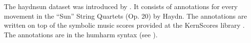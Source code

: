 

The \gls{haydnsun} dataset was introduced by
\textcite{napoleslopez2017automatic}. It consists of
annotations for every movement in the ``Sun'' String
Quartets (Op. 20) by Haydn. The annotations are written on
top of the symbolic music scores provided at the KernScores
library \parencite{sapp2005online}. The annotations are in
the \gls{humharm} syntax (see ).
